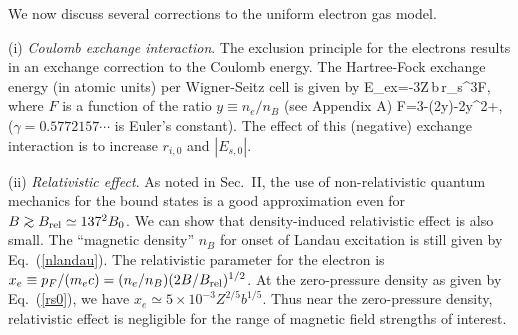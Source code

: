 We now discuss several corrections to the uniform electron gas model.

(i) {\it Coulomb exchange interaction}.
The exclusion principle for the electrons results in an exchange
correction to the Coulomb energy. The Hartree-Fock exchange energy 
(in atomic units) per Wigner-Seitz cell is given by 
\be
E_{ex}=-{3Z\,b\,r_s^3}F,
\ee
where $F$ is a function of the ratio $y\equiv n_e/n_{B}$ 
(see Appendix A)
\be F=3-\ln (2y)-{2} y^2+\cdots,
\ee
($\gamma=0.5772157\cdots$ is Euler's constant). 
The effect of this (negative) exchange interaction 
is to increase $r_{i,0}$ and $|E_{s,0}|$. 

(ii) {\it Relativistic effect}. As noted in Sec.~II,
the use of non-relativistic quantum mechanics for the bound states is a 
good approximation even for $B\go B_{\rm rel}\simeq 137^2 B_0$. We can show
that density-induced relativistic effect is also small.
The ``magnetic density'' $n_{B}$
for onset of Landau excitation is still given by Eq.~(\ref{nlandau}).
The relativistic parameter for the electron is 
$x_e\equiv p_F/(m_ec)=(n_e/n_{B})(2B/B_{\rm rel})^{1/2}$.
At the zero-pressure density as given by Eq.~(\ref{rs0}), we have 
$x_e\simeq 5\times 10^{-3} Z^{2/5}b^{1/5}$.
Thus near the zero-pressure density, relativistic effect is 
negligible for the range of magnetic field strengths of interest.


